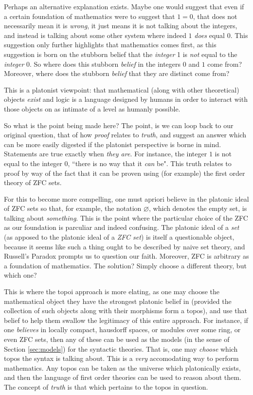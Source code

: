 \documentclass[12pt]{article}
\theoremstyle{plain}
\theoremstyle{definition}
\begin{document}
	Perhaps an alternative explanation exists. Maybe one would suggest that even if a certain foundation of mathematics were to suggest that $1 = 0$, that does not necessarily mean it is \emph{wrong}, it just means it is not talking about the integers, and instead is talking about some other system where indeed $1$ \emph{does} equal $0$. This suggestion only further highlights that mathematics comes first, as this suggestion is born on the stubborn belief that the \emph{integer} 1 is \emph{not} equal to the \emph{integer} 0. So where does this stubborn \emph{belief} in the integers $0$ and $1$ come from? Moreover, where does the stubborn \emph{belief} that they are distinct come from?
	
	This is a platonist viewpoint: that mathematical (along with other theoretical) objects \emph{exist} and logic is a language designed by humans in order to interact with those objects on as intimate of a level as humanly possible.
	
	So what is the point being made here? The point, is we can loop back to our original question, that of how \emph{proof} relates to \emph{truth}, and suggest an answer which can be more easily digested if the platonist perspective is borne in mind. Statements are true exactly when \emph{they are}. For instance, the integer $1$ is not equal to the integer $0$, ``there is no way that it \emph{can} be". This truth relates to proof by way of the fact that it can be proven using (for example) the first order theory of ZFC sets.
	
	For this to become more compelling, one must apriori believe in the platonic ideal of ZFC sets so that, for example, the notation $\varnothing$, which denotes the empty set, is talking about \emph{something}. This is the point where the particular choice of the ZFC as our foundation is parculiar and indeed confusing. The platonic ideal of a \emph{set} (as apposed to the platonic ideal of a \emph{ZFC set}) is itself a questionable object, because it seems like such a thing ought to be described by naive set theory, and Russell's Paradox prompts us to question our faith. Moreover, ZFC is  arbitrary as a foundation of mathematics. The solution? Simply choose a different theory, but which one?
	
	This is where the topoi approach is more elating, as one may choose the mathematical object they have the strongest platonic belief in (provided the collection of such objects along with their morphisms form a topos), and use that belief to help them swallow the legitimacy of this entire approach. For instance, if one \emph{believes} in locally compact, hausdorff spaces, or modules over some ring, or even ZFC sets, then any of these can be used as the models (in the sense of Section \ref{sec:models}) for the syntactic theories. That is, one may \emph{choose} which topos the syntax is talking about. This is a \emph{very} accomodating way to perform mathematics. Any topos can be taken as the universe which platonically exists, and then the language of first order theories can be used to reason about them. The concept of \emph{truth} is that which pertains to the topos in question.
	
\end{document}
